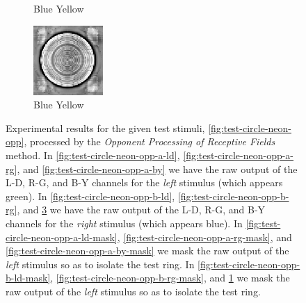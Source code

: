 \documentclass[journal,onecolumn]{IEEEtran}
\begin{document}
{\begin{figure}[H]
\begin{subfigure}[b]{0.25\textwidth}
            \caption{Blue Yellow}
            \label{fig:test-circle-neon-opp-b-by-mask}
    \end{subfigure}%
    \begin{subfigure}[b]{0.25\textwidth}
            \centering
            \includegraphics[width=100px, frame]{test-circle-neon-opp-b-by}
            \caption{Blue Yellow}
            \label{fig:test-circle-neon-opp-b-by}
    \end{subfigure}
    \caption{Experimental results for the given test stimuli, \ref{fig:test-circle-neon-opp}, processed by the \textit{Opponent Processing of Receptive Fields} method. In \ref{fig:test-circle-neon-opp-a-ld}, \ref{fig:test-circle-neon-opp-a-rg}, and \ref{fig:test-circle-neon-opp-a-by} we have the raw output of the L-D, R-G, and B-Y channels for the \textit{left} stimulus (which appears green). In \ref{fig:test-circle-neon-opp-b-ld}, \ref{fig:test-circle-neon-opp-b-rg}, and \ref{fig:test-circle-neon-opp-b-by} we have the raw output of the L-D, R-G, and B-Y channels for the \textit{right} stimulus (which appears blue). In \ref{fig:test-circle-neon-opp-a-ld-mask}, \ref{fig:test-circle-neon-opp-a-rg-mask}, and \ref{fig:test-circle-neon-opp-a-by-mask} we mask the raw output of the \textit{left} stimulus so as to isolate the test ring. In \ref{fig:test-circle-neon-opp-b-ld-mask}, \ref{fig:test-circle-neon-opp-b-rg-mask}, and \ref{fig:test-circle-neon-opp-b-by-mask} we mask the raw output of the \textit{left} stimulus so as to isolate the test ring.}
\end{figure}
\clearpage
}
\end{document}
